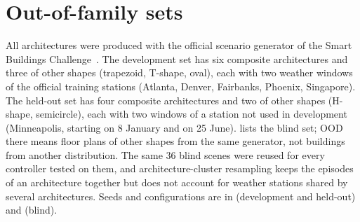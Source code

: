 \section{Out-of-family sets}\label{app:sets}
All architectures were produced with the official scenario generator of the Smart Buildings
Challenge~\cite{goldfeder2026challenge}. The development set has six composite architectures and three of other shapes
(trapezoid, T-shape, oval), each with two weather windows of the official training stations (Atlanta, Denver,
Fairbanks, Phoenix, Singapore). The held-out set has four composite architectures and two of other shapes (H-shape,
semicircle), each with two windows of a station not used in development (Minneapolis, starting on 8 January and on
25 June).  lists the blind set; OOD there means floor plans of other shapes from the same generator, not
buildings from another distribution. The same 36 blind scenes were reused for every controller tested on them, and
architecture-cluster resampling keeps the episodes of an architecture together but does not account for weather stations
shared by several architectures. Seeds and configurations are in 
(development and held-out) and  (blind).

